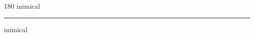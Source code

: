
\begin{frame}
\begin{center}
\begin{turn}{180}
{\fontsize{2.5cm}{1em}\selectfont inimical}
\end{turn}
\vspace{1em}\par  
\hrule
\vspace{1em}\par  
{\fontsize{2.5cm}{1em}\selectfont inimical}
\end{center}
\end{frame}
